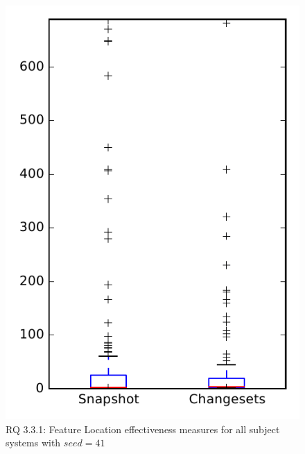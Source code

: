 
\begin{figure}
\centering
\includegraphics[height=0.4\textheight]{figures/flt_seed/rq1_overview_41}
\caption{RQ 3.3.1: Feature Location effectiveness measures for all subject systems with $seed=41$}
\label{fig:flt_seed:rq1:overview}
\end{figure}
